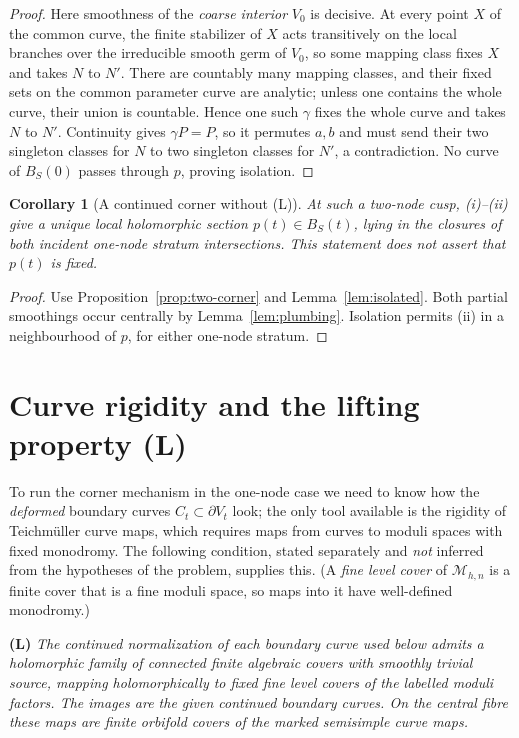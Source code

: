 \documentclass[12pt]{article}
\newcommand{\M}{\mathcal M}
\newtheorem{corollary}[theorem]{Corollary}
\theoremstyle{remark}
\begin{document}
\begin{proof}
Here smoothness of the \emph{coarse interior} \(V_0\) is
decisive. At every point \(X\) of the common curve, the
finite stabilizer of \(X\) acts transitively on the local
branches over the irreducible smooth germ of \(V_0\), so
some mapping class fixes \(X\) and takes \(N\) to \(N'\).
There are countably many mapping classes, and their fixed sets
on the common parameter curve are analytic; unless one
contains the whole curve, their union is countable.
Hence one such \(\gamma\) fixes the whole curve and takes
\(N\) to \(N'\). Continuity gives \(\gamma P=P\), so it permutes
\(a,b\) and must send their two singleton classes for
\(N\) to two singleton classes for \(N'\), a contradiction.
No curve of \(B_S(0)\) passes through \(p\), proving isolation.
\end{proof}

\begin{corollary}[A continued corner without (L)]\label{cor:corner-section}
At such a two-node cusp, (i)--(ii) give a unique local
holomorphic section \(p(t)\in B_S(t)\), lying in the closures
of both incident one-node stratum intersections.
This statement does not assert that \(p(t)\) is fixed.
\end{corollary}
\begin{proof}
Use Proposition~\ref{prop:two-corner} and
Lemma~\ref{lem:isolated}. Both partial smoothings occur centrally
by Lemma~\ref{lem:plumbing}. Isolation permits (ii) in a
neighbourhood of \(p\), for either one-node stratum.
\end{proof}

\section{Curve rigidity and the lifting property (L)}\label{sec:lifting}

To run the corner mechanism in the one-node case we need to know
how the \emph{deformed} boundary curves \(C_t\subset\partial V_t\)
look; the only tool available is the rigidity of Teichm\"uller
curve maps, which requires maps from curves to moduli spaces with
fixed monodromy. The following condition, stated separately and
\emph{not} inferred from the hypotheses of the problem, supplies
this. (A \emph{fine level cover} of \(\M_{h,n}\) is a finite cover
that is a fine moduli space, so maps into it have well-defined
monodromy.)

\noindent\textbf{(L)} \emph{The continued normalization of each
boundary curve used below admits a holomorphic family of connected
finite algebraic covers with smoothly trivial source, mapping
holomorphically to fixed fine level covers of the labelled moduli
factors. The images are the given continued boundary curves. On the
central fibre these maps are finite orbifold covers of the marked
semisimple curve maps.}
\end{document}
